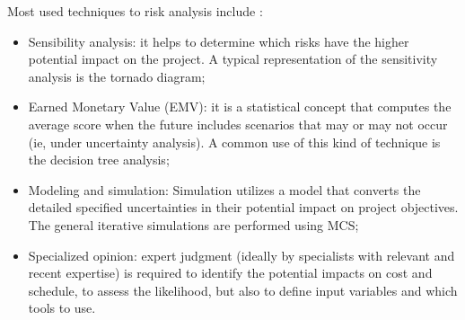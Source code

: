 Most used techniques to risk analysis include \cite{PMBOK2008}:
\begin{itemize}
\item Sensibility analysis: it helps to determine which risks have the higher potential impact on the project. A typical representation of the sensitivity analysis is the tornado diagram;
\item Earned Monetary Value (EMV): it is a statistical concept that computes the average score when the future includes scenarios that may or may not occur (ie, under uncertainty analysis). A common use of this kind of technique is the decision tree analysis;
\item Modeling and simulation: Simulation utilizes a model that converts the detailed specified uncertainties in their potential impact on project objectives. The general iterative simulations are performed using MCS;
\item Specialized opinion: expert judgment (ideally by specialists with relevant and recent expertise) is required to identify the potential impacts on cost and schedule, to assess the likelihood, but also to define input variables and which tools to use.
\end{itemize}

